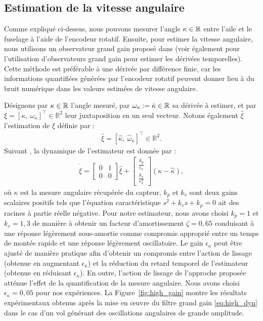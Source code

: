 
\subsection{Estimation de la vitesse angulaire}

Comme expliqué ci-dessus, nous pouvons mesurer l'angle $\kappa \in {\mathbb R}$ entre l'aile et le fuselage à l'aide de l'encodeur rotatif. Ensuite, pour estimer la vitesse angulaire, nous utilisons un observateur grand gain proposé dans \cite{203613} (voir également \cite{1032320} pour l'utilisation d'observateurs grand gain pour estimer les dérivées temporelles). Cette méthode est préférable à une dérivée par différence finie, car les informations quantifiées générées par l'encodeur rotatif peuvent donner lieu à du bruit numérique dans les valeurs estimées de vitesse angulaire.


Désignons par $\kappa \in {\mathbb R}$ l'angle mesuré, par $\omega_{\kappa} := \dot \kappa  \in {\mathbb R}$ sa dérivée à estimer, et par $\xi = [\kappa,~\omega_{\kappa}]^\top \in \mathbb{R}^2$ leur juxtaposition en un seul vecteur. Notons également $\hat{\xi}$ l'estimation de $\xi$ définie par :
\begin{align*}
    \hat{\xi} = [\hat{\kappa},~\hat{\omega}_{\kappa}]^\top \in \mathbb{R}^2.
\end{align*}
Suivant \cite{203613}, la dynamique de l'estimateur est donnée par :
\begin{align}
\label{eq:high_dyn}
    \dot{\hat{\xi}} =  \begin{bmatrix}0 & 1 \\ 0 & 0 \end{bmatrix} \hat{\xi}+ \begin{bmatrix}\frac{k_{p}}{\epsilon_{\kappa}}  \\ \frac{k_{v}}{\epsilon_{\kappa}^{2}}  \end{bmatrix} (\kappa - \hat{\kappa}),
\end{align}
où $\kappa$ est la mesure angulaire récupérée du capteur, $k_{p}$ et $k_{v}$ sont deux gains scalaires positifs tels que l'équation caractéristique $s^{2} + k_{v} s + k_{p} = 0$ ait des racines à partie réelle négative. Pour notre estimateur, nous avons choisi $k_{p} = 1$ et $k_{v} = 1,3$ de manière à obtenir un facteur d'amortissement $\zeta = 0,65$ conduisant à une réponse légèrement sous-amortie comme compromis approprié entre un temps de montée rapide et une réponse légèrement oscillatoire. Le gain $\epsilon_{\kappa}$ peut être ajusté de manière pratique afin d'obtenir un compromis entre l'action de lissage (obtenue en augmentant $\epsilon_{\kappa}$) et la réduction du retard temporel
de l'estimateur (obtenue en réduisant $\epsilon_{\kappa}$). En outre, l'action de lissage de l'approche proposée atténue l'effet de la quantification de la mesure angulaire. Nous avons choisi $\epsilon_{\kappa} = 0,05$ pour nos expériences. La Figure~\ref{fig:high_gain} montre les résultats expérimentaux obtenus après la mise en œuvre du filtre grand gain \eqref{eq:high_dyn} dans le cas d'un vol générant des oscillations angulaires de grande amplitude.


